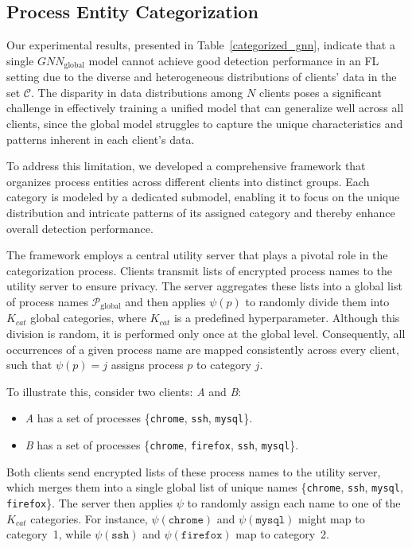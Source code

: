 \subsection{Process Entity Categorization}
\label{sys:catg}

Our experimental results, presented in Table~\ref{categorized_gnn}, indicate that a single \( {GNN}_{\text{global}} \) model cannot achieve good detection performance in an FL setting due to the diverse and heterogeneous distributions of clients' data in the set \( \mathcal{C} \). The disparity in data distributions among \( N \) clients poses a significant challenge in effectively training a unified model that can generalize well across all clients, since the global model struggles to capture the unique characteristics and patterns inherent in each client's data.

To address this limitation, we developed a comprehensive framework that organizes process entities across different clients into distinct groups. Each category is modeled by a dedicated submodel, enabling it to focus on the unique distribution and intricate patterns of its assigned category and thereby enhance overall detection performance.

The framework employs a central utility server that plays a pivotal role in the categorization process. Clients transmit lists of encrypted process names to the utility server to ensure privacy. The server aggregates these lists into a global list of process names \( \mathcal{P}_{\text{global}} \) and then applies \( \psi(p) \) to randomly divide them into \( K_{cat} \) global categories, where \( K_{cat} \) is a predefined hyperparameter. Although this division is random, it is performed only once at the global level. Consequently, all occurrences of a given process name are mapped consistently across every client, such that \( \psi(p) = j \) assigns process \( p \) to category \( j \).

To illustrate this, consider two clients: \emph{A} and \emph{B}:
\begin{itemize}
    \item \emph{A} has a set of processes \{\texttt{chrome}, \texttt{ssh}, \texttt{mysql}\}.
    \item \emph{B} has a set of processes \{\texttt{chrome}, \texttt{firefox}, \texttt{ssh}, \texttt{mysql}\}.
\end{itemize}

Both clients send encrypted lists of these process names to the utility server, which merges them into a single global list of unique names \{\texttt{chrome}, \texttt{ssh}, \texttt{mysql}, \texttt{firefox}\}. The server then applies \( \psi \) to randomly assign each name to one of the \( K_{cat} \) categories. For instance, \( \psi(\texttt{chrome}) \) and \( \psi(\texttt{mysql}) \) might map to category~1, while \( \psi(\texttt{ssh}) \) and \( \psi(\texttt{firefox}) \) map to category~2.

